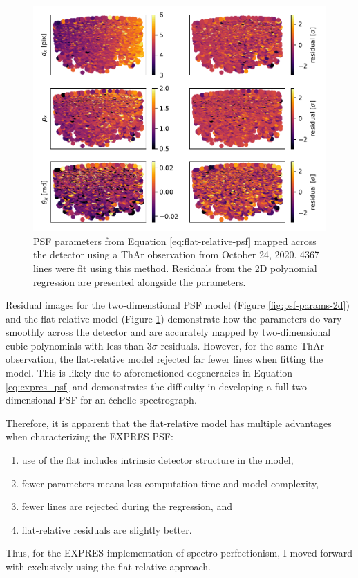 \begin{figure}
    \centering
    \includegraphics[width=\textwidth]{figures-5/psf-params-1d.pdf}
    \caption{PSF parameters from Equation \ref{eq:flat-relative-psf} mapped across the detector using a ThAr observation from October 24, 2020. 4367 lines were fit using this method. Residuals from the 2D polynomial regression are presented alongside the parameters.}
    \label{fig:psf-params-1d}
\end{figure}

Residual images for the two-dimenstional PSF model (Figure \ref{fig:psf-params-2d}) and the flat-relative model (Figure \ref{fig:psf-params-1d}) demonstrate how the parameters do vary smoothly across the detector and are accurately mapped by two-dimensional cubic polynomials with less than $3\sigma$ residuals. However, for the same ThAr observation, the flat-relative model rejected far fewer lines when fitting the model. This is likely due to aforemetioned degeneracies in Equation \ref{eq:expres_psf} and demonstrates the difficulty in developing a full two-dimensional PSF for an \'{e}chelle spectrograph.

Therefore, it is apparent that the flat-relative model has multiple advantages when characterizing the EXPRES PSF:
\begin{enumerate}
    \item use of the flat includes intrinsic detector structure in the model,
    \item fewer parameters means less computation time and model complexity,
    \item fewer lines are rejected during the regression, and
    \item flat-relative residuals are slightly better.
\end{enumerate}
Thus, for the EXPRES implementation of spectro-perfectionism, I moved forward with exclusively using the flat-relative approach.

